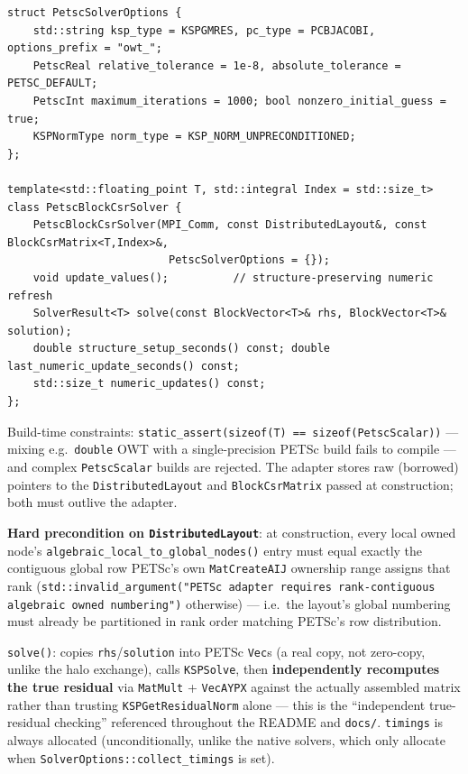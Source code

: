\documentclass[11pt,a4paper]{report}
\begin{document}
\begin{lstlisting}
struct PetscSolverOptions {
    std::string ksp_type = KSPGMRES, pc_type = PCBJACOBI, options_prefix = "owt_";
    PetscReal relative_tolerance = 1e-8, absolute_tolerance = PETSC_DEFAULT;
    PetscInt maximum_iterations = 1000; bool nonzero_initial_guess = true;
    KSPNormType norm_type = KSP_NORM_UNPRECONDITIONED;
};

template<std::floating_point T, std::integral Index = std::size_t>
class PetscBlockCsrSolver {
    PetscBlockCsrSolver(MPI_Comm, const DistributedLayout&, const BlockCsrMatrix<T,Index>&,
                         PetscSolverOptions = {});
    void update_values();          // structure-preserving numeric refresh
    SolverResult<T> solve(const BlockVector<T>& rhs, BlockVector<T>& solution);
    double structure_setup_seconds() const; double last_numeric_update_seconds() const;
    std::size_t numeric_updates() const;
};
\end{lstlisting}

Build-time constraints: \lstinline!static_assert(sizeof(T) == sizeof(PetscScalar))!
--- mixing e.g.\ \lstinline!double! OWT with a single-precision PETSc build
fails to compile --- and complex \lstinline!PetscScalar! builds are rejected.
The adapter stores raw (borrowed) pointers to the \lstinline!DistributedLayout!
and \lstinline!BlockCsrMatrix! passed at construction; both must outlive the
adapter.

\textbf{Hard precondition on \lstinline!DistributedLayout!}: at construction,
every local owned node's \lstinline!algebraic_local_to_global_nodes()! entry
must equal exactly the contiguous global row PETSc's own
\lstinline!MatCreateAIJ! ownership range assigns that rank
(\lstinline!std::invalid_argument("PETSc adapter requires rank-contiguous algebraic owned numbering")!
otherwise) --- i.e.\ the layout's global numbering must already be
partitioned in rank order matching PETSc's row distribution.

\lstinline!solve()!: copies \lstinline!rhs!/\lstinline!solution! into PETSc \lstinline!Vec!s (a real
copy, not zero-copy, unlike the halo exchange), calls \lstinline!KSPSolve!,
then \textbf{independently recomputes the true residual} via
\lstinline!MatMult! + \lstinline!VecAYPX! against the actually assembled matrix
rather than trusting \lstinline!KSPGetResidualNorm! alone --- this is the
``independent true-residual checking'' referenced throughout the
README and \texttt{docs/}. \lstinline!timings! is always allocated
(unconditionally, unlike the native solvers, which only allocate when
\lstinline!SolverOptions::collect_timings! is set).
\end{document}

